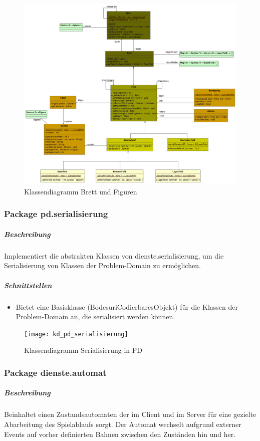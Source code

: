 \documentclass[12pt,halfparskip]{scrartcl}
\begin{document}
\label{ssub:diagramme}
\begin{figure}[h]
	\centering
	\includegraphics[width=\textwidth]{pd_brett}
	\caption{Klassendiagramm Brett und Figuren}
	\label{fig:pd_brett}
\end{figure}

\clearpage
\subsubsection{Package pd.serialisierung}

\subparagraph{Beschreibung}
Implementiert die abstrakten Klassen von dienste.serialisierung, um die Serialisierung von Klassen der Problem-Domain zu ermöglichen.

\subparagraph{Schnittstellen}
\begin{itemize}
	\item Bietet eine Basisklasse (BodesuriCodierbaresObjekt) für die Klassen der Problem-Domain an, die serialisiert werden können.
\end{itemize}

\begin{figure}[h]
	\centering
	\texttt{[image: kd\_pd\_serialisierung]}
	\caption{Klassendiagramm Serialisierung in PD}
	\label{fig:kd_pd_serialisierung}
\end{figure}

\clearpage
\subsubsection{Package dienste.automat}
\label{ssub:package_dienste}
\subparagraph{Beschreibung}
Beinhaltet einen Zustandsautomaten der im Client und im Server für eine gezielte Abarbeitung des Spielablaufs sorgt. Der Automat wechselt aufgrund externer Events auf vorher definierten Bahnen zwischen den Zuständen hin und her.
\end{document}
